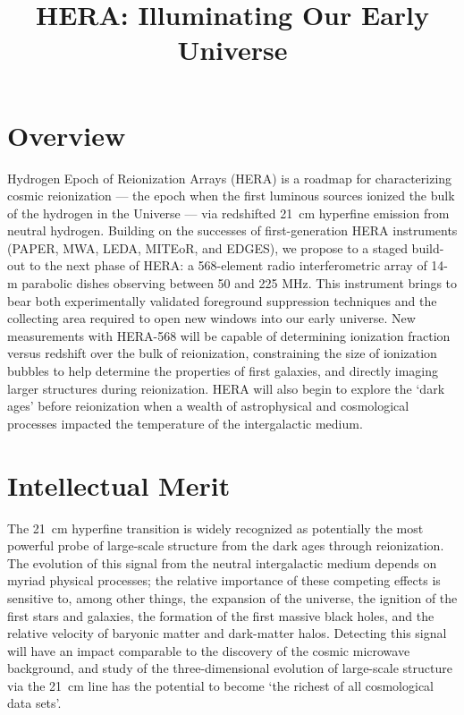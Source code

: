 \documentclass[preprint]{aastex}
\begin{document}
\pagestyle{empty}

\title{HERA: Illuminating Our Early Universe}

\section*{Overview}

Hydrogen Epoch of Reionization Arrays (HERA) is a roadmap for characterizing
cosmic reionization --- the epoch when the first luminous sources ionized the
bulk of the hydrogen in the Universe --- via redshifted 21~cm hyperfine
emission from neutral hydrogen.  Building on the successes of first-generation
HERA instruments (PAPER, MWA, LEDA, MITEoR, and EDGES), we propose to a staged
build-out to the next phase of HERA: a 568-element radio interferometric array
of 14-m parabolic dishes observing between 50 and 225 MHz.  This
instrument brings to bear both experimentally validated
foreground suppression techniques and the collecting area required to open new windows into our early
universe.  New measurements with HERA-568 will be capable of determining
ionization fraction versus redshift over the bulk of reionization,
constraining the size of ionization bubbles to help determine the properties of
first galaxies, and directly imaging larger structures during
reionization.  HERA will also begin to explore the `dark ages' before 
reionization when a wealth of astrophysical and cosmological processes
impacted the temperature of the intergalactic medium.

\section*{Intellectual Merit}

The 21~cm hyperfine transition is widely recognized as potentially the most
powerful probe of large-scale structure from the dark ages through
reionization.  The evolution of this signal from the neutral intergalactic
medium depends on myriad physical processes; the relative importance of
these competing effects is sensitive to, among other things, the expansion of
the universe, the ignition of the first stars and galaxies, the formation of
the first massive black holes, and the relative
velocity of baryonic matter and dark-matter halos.
Detecting this signal will have an impact
comparable to the discovery of the cosmic microwave background, and study of the three-dimensional
evolution of large-scale structure via the 21~cm line has the
potential to become `the richest of all cosmological data sets'.
\end{document}
